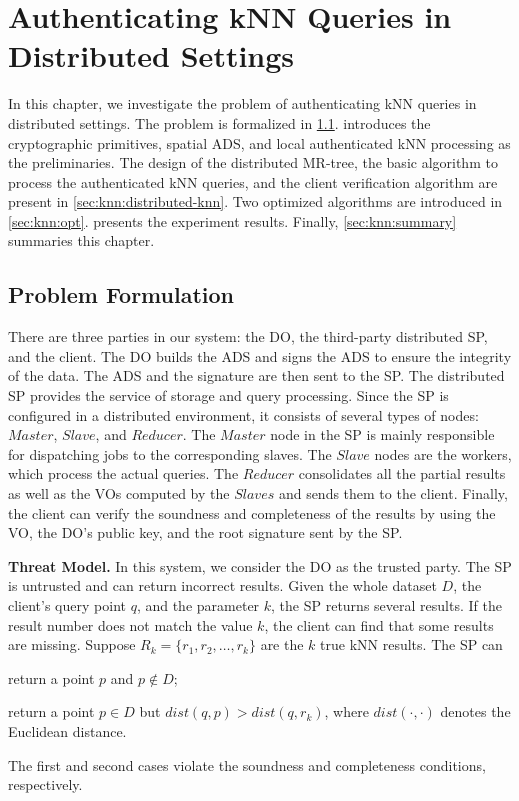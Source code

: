 \chapter{Authenticating {kNN} Queries in Distributed Settings}\label{chap:knn}

In this chapter, we investigate the problem of authenticating {kNN} queries in distributed settings. The problem is formalized in \cref{sec:knn:problem}.  introduces the cryptographic primitives, spatial ADS, and local authenticated kNN processing as the preliminaries. The design of the distributed MR-tree, the basic algorithm to process the authenticated kNN queries, and the client verification algorithm are present in \cref{sec:knn:distributed-knn}. Two optimized algorithms are introduced in \cref{sec:knn:opt}.  presents the experiment results. Finally, \cref{sec:knn:summary} summaries this chapter.

\section{Problem Formulation}\label{sec:knn:problem}

There are three parties in our system: the DO, the third-party distributed SP, and the client. The DO builds the ADS and signs the ADS to ensure the integrity of the data. The ADS and the signature are then sent to the SP\@. The distributed SP provides the service of storage and query processing. Since the SP is configured in a distributed environment, it consists of several types of nodes: $Master$, $Slave$, and $Reducer$. The $Master$ node in the SP is mainly responsible for dispatching jobs to the corresponding slaves. The $Slave$ nodes are the workers, which process the actual queries. The $Reducer$ consolidates all the partial results as well as the VOs computed by the $Slaves$ and sends them to the client. Finally, the client can verify the soundness and completeness of the results by using the VO, the DO's public key, and the root signature sent by the SP\@.

\textbf{Threat Model.}
In this system, we consider the DO as the trusted party. The SP is untrusted and can return incorrect results. Given the whole dataset $D$, the client's query point $q$, and the parameter $k$, the SP returns several results. If the result number does not match the value $k$, the client can find that some results are missing. Suppose $R_{k}=\{r_{1},r_{2},\dots,r_{k}\}$ are the $k$ true kNN results. The SP can
\begin{inlineenum}
\item return a point $p$ and $p \notin D$;
\item return a point $p \in D$ but $dist(q,p) > dist(q,r_{k})$, where $dist(\cdot,\cdot)$ denotes the Euclidean distance.
\end{inlineenum}
The first and second cases violate the soundness and completeness conditions, respectively.

